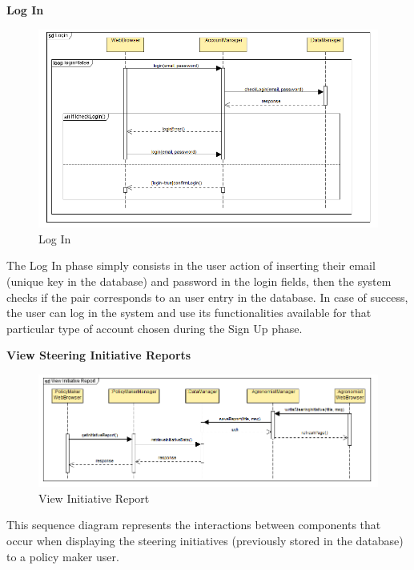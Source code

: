 \documentclass[table, 12pt]{article}
\begin{document}
\newpage
\textbf{Log In}
\begin{center}
    \begin{figure}[H]
        \includegraphics[scale=0.8, center]{assets/SequenceDiagram/Login.png}
        \caption{Log In}
        \label{fig: login}
    \end{figure}
\end{center}

The Log In phase simply consists in the user action of inserting their email (unique key in the database) and password in the login fields, then the system checks if the pair corresponds to an user entry in the database.
In case of success, the user can log in the system and use its functionalities available for that particular type of account chosen during the Sign Up phase.

\newpage
\textbf{View Steering Initiative Reports}
\begin{center}
    \begin{figure}[H]
        \includegraphics[scale=0.6, center]{assets/SequenceDiagram/ViewInitiativeReport.png}
        \caption{View Initiative Report}
        \label{fig: report}
    \end{figure}
\end{center}
This sequence diagram represents the interactions between components that occur when displaying the steering initiatives (previously stored in the database) to a policy maker user.
\end{document}
